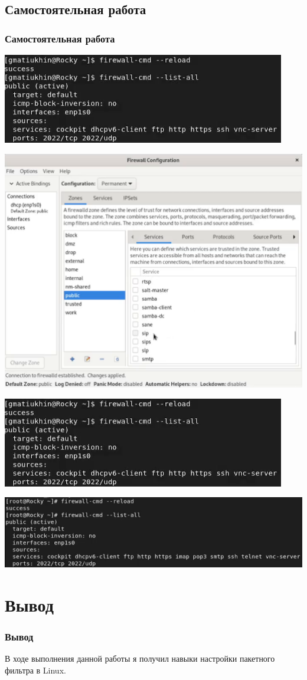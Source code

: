 \documentclass{beamer}
\begin{document}
\subsection{Самостоятельная работа}
\begin{frame}[plain]
	\frametitle{Самостоятельная работа}
	\includegraphics{14.png}
\end{frame}
\begin{frame}[plain]
	\includegraphics{16.png}
\end{frame}
\begin{frame}[plain]
	\includegraphics{14.png}
\end{frame}
\begin{frame}[plain]
	\includegraphics{17.png}
\end{frame}

\section{Вывод}
\begin{frame}[plain]
	\frametitle{Вывод}
	В ходе выполнения данной работы я получил навыки настройки пакетного фильтра в Linux.
\end{frame}
\end{document}
